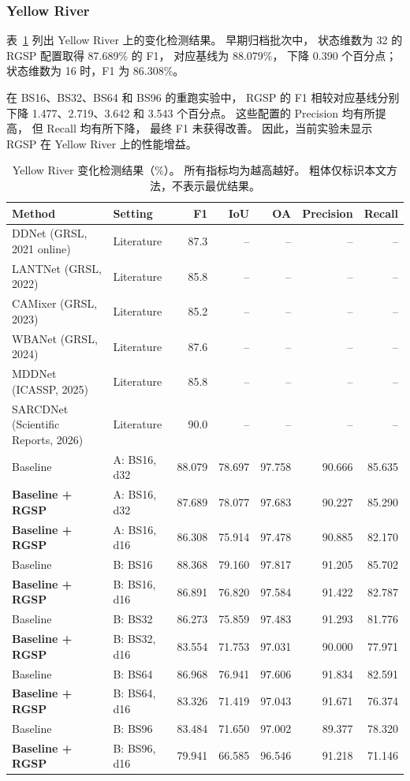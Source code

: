 \documentclass[journal]{IEEEtran}
\begin{document}
\subsubsection{Yellow River}
\label{sec:yellow_river_results}

表~\ref{tab:yellow_river_comparison}
列出 Yellow River 上的变化检测结果。
早期归档批次中，
状态维数为 32 的 RGSP 配置取得
87.689\% 的 F1，
对应基线为 88.079\%，
下降 0.390 个百分点；
状态维数为 16 时，F1 为 86.308\%。

在 BS16、BS32、BS64 和 BS96 的重跑实验中，
RGSP 的 F1 相较对应基线分别下降
1.477、2.719、3.642 和 3.543 个百分点。
这些配置的 Precision 均有所提高，
但 Recall 均有所下降，
最终 F1 未获得改善。
因此，当前实验未显示 RGSP 在
Yellow River 上的性能增益。

\begin{table}[!t]
\centering
\scriptsize
\setlength{\tabcolsep}{2pt}
\renewcommand{\arraystretch}{1.12}
\caption{Yellow River 变化检测结果（\%）。
所有指标均为越高越好。
粗体仅标识本文方法，不表示最优结果。}
\label{tab:yellow_river_comparison}
\begin{tabularx}{\linewidth}{@{}Xlrrrrr@{}}
\toprule
Method & Setting & F1 & IoU & OA & Precision & Recall \\
\midrule
DDNet (GRSL, 2021 online)
& Literature & 87.3 & -- & -- & -- & -- \\
LANTNet (GRSL, 2022)
& Literature & 85.8 & -- & -- & -- & -- \\
CAMixer (GRSL, 2023)
& Literature & 85.2 & -- & -- & -- & -- \\
WBANet (GRSL, 2024)
& Literature & 87.6 & -- & -- & -- & -- \\
MDDNet (ICASSP, 2025)
& Literature & 85.8 & -- & -- & -- & -- \\
SARCDNet (Scientific Reports, 2026)
& Literature & 90.0 & -- & -- & -- & -- \\
\midrule
Baseline
& A: BS16, d32
& 88.079 & 78.697 & 97.758 & 90.666 & 85.635 \\
\textbf{Baseline + RGSP}
& A: BS16, d32
& 87.689 & 78.077 & 97.683 & 90.227 & 85.290 \\
\textbf{Baseline + RGSP}
& A: BS16, d16
& 86.308 & 75.914 & 97.478 & 90.885 & 82.170 \\
\midrule
Baseline
& B: BS16
& 88.368 & 79.160 & 97.817 & 91.205 & 85.702 \\
\textbf{Baseline + RGSP}
& B: BS16, d16
& 86.891 & 76.820 & 97.584 & 91.422 & 82.787 \\
Baseline
& B: BS32
& 86.273 & 75.859 & 97.483 & 91.293 & 81.776 \\
\textbf{Baseline + RGSP}
& B: BS32, d16
& 83.554 & 71.753 & 97.031 & 90.000 & 77.971 \\
Baseline
& B: BS64
& 86.968 & 76.941 & 97.606 & 91.834 & 82.591 \\
\textbf{Baseline + RGSP}
& B: BS64, d16
& 83.326 & 71.419 & 97.043 & 91.671 & 76.374 \\
Baseline
& B: BS96
& 83.484 & 71.650 & 97.002 & 89.377 & 78.320 \\
\textbf{Baseline + RGSP}
& B: BS96, d16
& 79.941 & 66.585 & 96.546 & 91.218 & 71.146 \\
\bottomrule
\end{tabularx}


\end{table}
\end{document}
